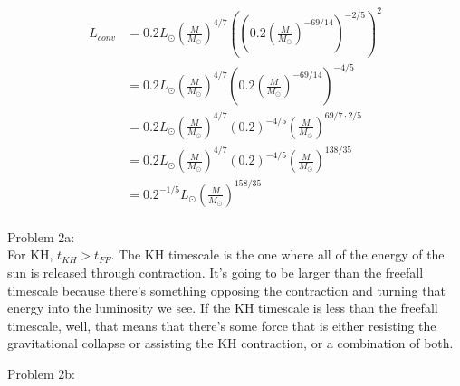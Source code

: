 \documentclass[10pt,a4paper,final]{article}
\begin{document}
\begin{align}
L_{conv} &  = 0.2L_\odot \left( \frac{M}{M_\odot} \right)^{4/7} \left( \left( 0.2 \left( \frac{M}{M_\odot} \right)^{-69/14} \right)^{-2/5} \right)^2\\
& = 0.2L_\odot \left( \frac{M}{M_\odot} \right) ^{4/7} \left( 0.2 \left( \frac{M}{M_\odot} \right)^{-69/14} \right)^{-4/5}\\
& = 0.2L_\odot \left( \frac{M}{M_\odot} \right)^{4/7} (0.2)^{-4/5} \left( \frac{M}{M_\odot} \right)^{69/7 \cdot 2/5}\\
& = 0.2L_\odot \left( \frac{M}{M_\odot} \right)^{4/7} (0.2)^{-4/5} \left( \frac{M}{M_\odot} \right)^{138/35}\\
& = 0.2^{-1/5}L_\odot \left( \frac{M}{M_\odot} \right)^{158/35}\\
\end{align}
\newpage

Problem 2a:\\
\indent For KH, $t_{KH} > t_{FF}$. The KH timescale is the one where all of the energy of the sun is released through contraction. It's going to be larger than the freefall timescale because there's something opposing the contraction and turning that energy into the luminosity we see. If the KH timescale is less than the freefall timescale, well, that means that there's some force that is either resisting the gravitational collapse or assisting the KH contraction, or a combination of both.
\newpage

Problem 2b:
\end{document}
